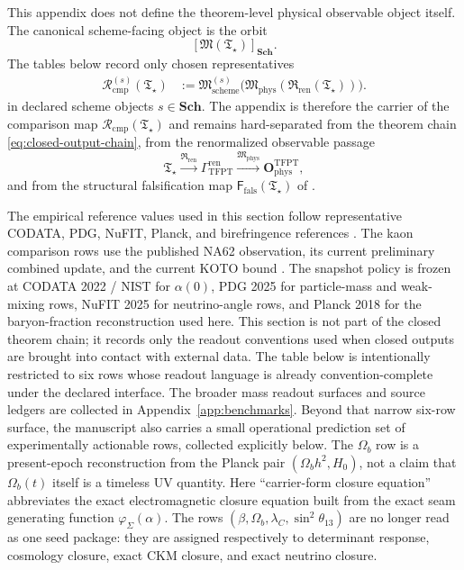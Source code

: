 \documentclass[11pt,a4paper]{article}
\theoremstyle{definition}
\theoremstyle{remark}
\newcommand{\phiseam}{\varphi_{\Sigma}}
\newcommand{\Tstar}{\mathfrak T_{\star}}
\newcommand{\Ffals}{\mathsf F_{\mathrm{fals}}}
\newcommand{\Rcmp}{\mathcal R_{\mathrm{cmp}}}
\newcommand{\GrenTFPT}{\Gamma_{\mathrm{TFPT}}^{\mathrm{ren}}}
\newcommand{\OphysTFPT}{\mathbf O_{\mathrm{phys}}^{\mathrm{TFPT}}}
\newcommand{\SchGrp}{\mathbf{Sch}}
\newcommand{\Mop}{\mathfrak M}
\newcommand{\Mphys}{\mathfrak M_{\mathrm{phys}}}
\newcommand{\Mscheme}{\mathfrak M_{\mathrm{scheme}}}
\newcommand{\Rren}{\mathfrak R_{\mathrm{ren}}}
\begin{document}
This appendix does not define the theorem-level physical observable object itself. The canonical
scheme-facing object is the orbit
\[
[\Mop(\Tstar)]_{\SchGrp}.
\]
The tables below record only chosen representatives
\[
\begin{aligned}
\Rcmp^{(s)}(\Tstar)
&:=
\Mscheme^{(s)}\!\bigl(\Mphys(\Rren(\Tstar))\bigr).
\end{aligned}
\]
in declared scheme objects $s\in\SchGrp$. The appendix is therefore the carrier of the comparison
map $\Rcmp(\Tstar)$ and remains hard-separated from the theorem chain
\eqref{eq:closed-output-chain}, from the renormalized observable passage
\[
\Tstar\xrightarrow{\Rren}\GrenTFPT\xrightarrow{\Mphys}\OphysTFPT,
\]
and from the structural falsification map $\Ffals(\Tstar)$ of
.

The empirical reference values used in this section follow representative CODATA, PDG, NuFIT, Planck,
and birefringence references
\cite{codata2022,pdg2025,nufit2025,planck2018,minamiKomatsu2020,eskilt2023,sullivan2025}. The
kaon comparison rows use the published NA62 observation, its current preliminary combined update,
and the current KOTO bound \cite{na62obs2025,na62Moriond2026,koto2024}. The
snapshot policy is frozen at CODATA 2022 / NIST for $\alpha(0)$, PDG 2025 for particle-mass and
weak-mixing rows, NuFIT 2025 for neutrino-angle rows, and Planck 2018 for the baryon-fraction
reconstruction used here. This section is not part of the closed theorem chain; it records only
the readout conventions used when closed outputs are brought into contact with external data.
The table below is intentionally restricted to six rows whose readout language is already
convention-complete under the declared interface. The broader mass readout surfaces and source
ledgers are collected in Appendix~\ref{app:benchmarks}. Beyond that narrow six-row surface, the
manuscript also carries a
small operational prediction set of experimentally actionable rows, collected explicitly below.
The $\Omega_b$ row is a present-epoch reconstruction from the Planck pair $(\Omega_b h^2,H_0)$,
not a claim that $\Omega_b(t)$ itself is a timeless UV quantity. Here \enquote{carrier-form
closure equation} abbreviates the exact electromagnetic closure equation built from the exact seam generating
function $\phiseam(\alpha)$. The rows $(\beta,\Omega_b,\lambda_C,\sin^2\theta_{13})$ are no longer
read as one seed package: they are assigned respectively to determinant response, cosmology
closure, exact CKM closure, and exact neutrino closure.
\end{document}

